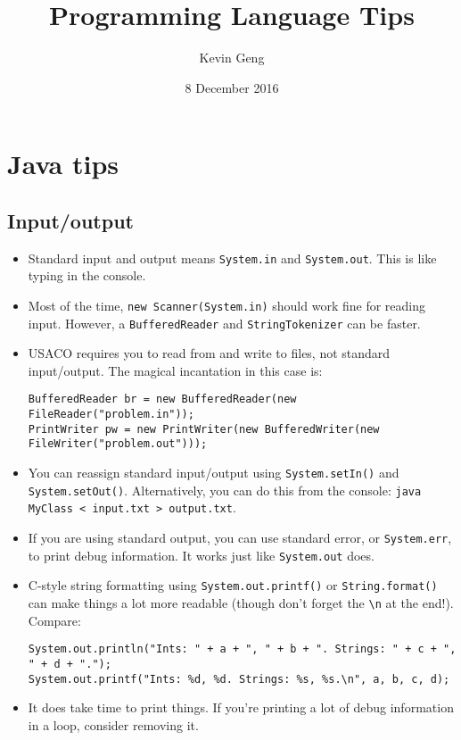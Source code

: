 \documentclass{article}
\title{Programming Language Tips}
\author{Kevin Geng}
\date{8 December 2016}
\begin{document}
\maketitle

\section{Java tips}

\subsection{Input/output}

\begin{itemize}
    \item Standard input and output means \verb|System.in| and \verb|System.out|. This is like typing in the console.
    \item Most of the time, \verb|new Scanner(System.in)| should work fine for reading input. However, a \verb|BufferedReader| and \verb|StringTokenizer| can be faster.

    \item USACO requires you to read from and write to files, not standard input/output. The magical incantation in this case is:
    \begin{lstlisting}
BufferedReader br = new BufferedReader(new FileReader("problem.in"));
PrintWriter pw = new PrintWriter(new BufferedWriter(new FileWriter("problem.out")));
	\end{lstlisting}

    \item You can reassign standard input/output using \verb|System.setIn()| and \verb|System.setOut()|. Alternatively, you can do this from the console: \verb|java MyClass < input.txt > output.txt|.
    \item If you are using standard output, you can use standard error, or \verb|System.err|, to print debug information. It works just like \verb|System.out| does.
    \item C-style string formatting using \verb|System.out.printf()| or \verb|String.format()| can make things a lot more readable (though don't forget the \verb|\n| at the end!). Compare:
    \begin{lstlisting}
System.out.println("Ints: " + a + ", " + b + ". Strings: " + c + ", " + d + ".");
System.out.printf("Ints: %d, %d. Strings: %s, %s.\n", a, b, c, d);
\end{lstlisting}
    \item It does take time to print things. If you're printing a lot of debug information in a loop, consider removing it.
\end{itemize}
\end{document}
